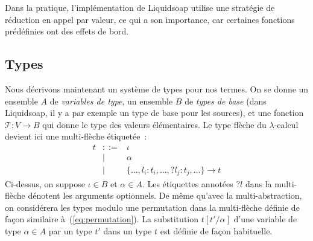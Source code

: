 \documentclass[twoside]{article}
\newcommand{\liquidsoap}{Liquidsoap}
\newcommand{\tmabs}[2]{\{#1\}\to #2}
\theoremstyle{plain}
\theoremstyle{definition}
\theoremstyle{remark}
\newtheorem{exemple}{Exemple}
\begin{document}

Dans la pratique, l'implémentation de \liquidsoap{} utilise une stratégie de
réduction en appel par valeur, ce qui a son importance, car certaines fonctions
prédéfinies ont des effets de bord.

\subsection{Types}
\label{section:types}
Nous décrivons maintenant un système de types pour nos termes.
On se donne un ensemble $A$ de \emph{variables de type}, un
ensemble $B$ de \emph{types de base} (dans \liquidsoap{}, il y a par exemple un
type de base pour les sources), et une fonction $\mathcal{T}:V\to B$
qui donne le type des valeurs élémentaires. Le type flèche du $\lambda$-calcul
devient ici une multi-flèche étiquetée~:
\begin{eqnarray*}
  t &::=& \iota \label{tt:base} \\
  &|& \alpha \label{tt:var} \\
  &|& \{\ldots, l_i:t_i,\ldots, ?l_j:t_j, \ldots\} \rightarrow t \label{tt:abs}
\end{eqnarray*}
Ci-dessus, on suppose $\iota\in B$ et $\alpha\in A$. Les étiquettes annotées
$?l$ dans la multi-flèche dénotent les arguments optionnels. De même qu'avec la
multi-abstraction, on considérera les types modulo une permutation dans la
multi-flèche définie de façon similaire à~(\ref{eq:permutation}). La
substitution $t[t'/\alpha]$ d'une variable de type $\alpha\in A$ par un type
$t'$ dans un type $t$ est définie de façon habituelle.

\end{document}
